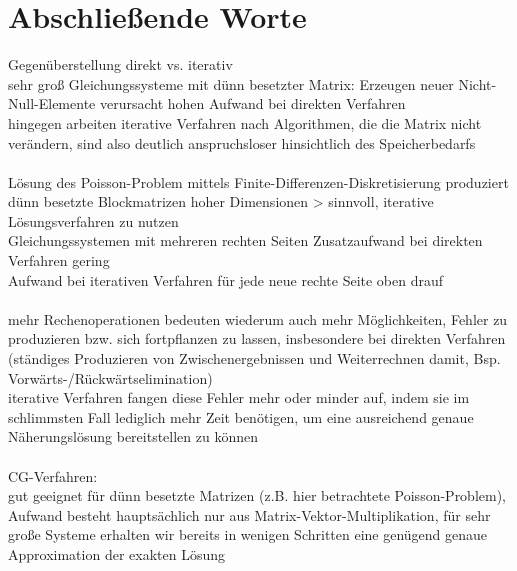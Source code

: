 \documentclass{scrartcl}
\begin{document}
\section{Abschließende Worte}
Gegenüberstellung direkt vs. iterativ
\\
sehr groß Gleichungssysteme mit dünn besetzter Matrix: Erzeugen neuer Nicht-Null-Elemente verursacht hohen Aufwand bei direkten Verfahren \\
hingegen arbeiten iterative Verfahren nach Algorithmen, die die Matrix nicht verändern, sind also deutlich anspruchsloser hinsichtlich des Speicherbedarfs \\
\\
Lösung des Poisson-Problem mittels Finite-Differenzen-Diskretisierung produziert dünn besetzte Blockmatrizen hoher Dimensionen > sinnvoll, iterative Lösungsverfahren zu nutzen \\
Gleichungssystemen mit mehreren rechten Seiten Zusatzaufwand bei direkten Verfahren gering \\
Aufwand bei iterativen Verfahren für jede neue rechte Seite oben drauf \\
\\
mehr Rechenoperationen bedeuten wiederum auch mehr Möglichkeiten, Fehler zu produzieren bzw. sich fortpflanzen zu lassen, insbesondere bei direkten Verfahren (ständiges Produzieren von Zwischenergebnissen und Weiterrechnen damit, Bsp. Vorwärts-/Rückwärtselimination) \\
iterative Verfahren fangen diese Fehler mehr oder minder auf, indem sie im schlimmsten Fall lediglich mehr Zeit benötigen, um eine ausreichend genaue Näherungslösung bereitstellen zu können \\
\\
CG-Verfahren: \\
gut geeignet für dünn besetzte Matrizen (z.B. hier betrachtete Poisson-Problem), Aufwand besteht hauptsächlich nur aus Matrix-Vektor-Multiplikation, für sehr große Systeme erhalten wir bereits in wenigen Schritten eine genügend genaue Approximation der exakten Lösung \\


\pagebreak


\end{document}
